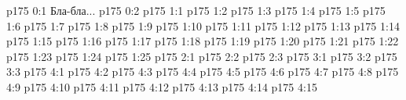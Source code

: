 \author{Промежуточные создания}
\vs p175 0:1  Бла-бла...
\vs p175 0:2 
\vs p175 1:1 
\vs p175 1:2 
\vs p175 1:3 
\vs p175 1:4 
\vs p175 1:5 
\vs p175 1:6 
\vs p175 1:7 
\vs p175 1:8 
\vs p175 1:9 
\vs p175 1:10 
\vs p175 1:11 
\vs p175 1:12 
\vs p175 1:13 
\vs p175 1:14 
\vs p175 1:15 
\vs p175 1:16 
\vs p175 1:17 
\vs p175 1:18 
\vs p175 1:19 
\vs p175 1:20 
\vs p175 1:21 
\vs p175 1:22 
\vs p175 1:23 
\vs p175 1:24 
\vs p175 1:25 
\vs p175 2:1 
\vs p175 2:2 
\vs p175 2:3 
\vs p175 3:1 
\vs p175 3:2 
\vs p175 3:3 
\vs p175 4:1 
\vs p175 4:2 \pc 
\vs p175 4:3 \pc 
\vs p175 4:4 
\vs p175 4:5 
\vs p175 4:6 
\vs p175 4:7 
\vs p175 4:8 \pc 
\vs p175 4:9 
\vs p175 4:10 
\vs p175 4:11 
\vs p175 4:12 
\vs p175 4:13 \pc 
\vs p175 4:14 
\vs p175 4:15 \pc 
\quizlink
